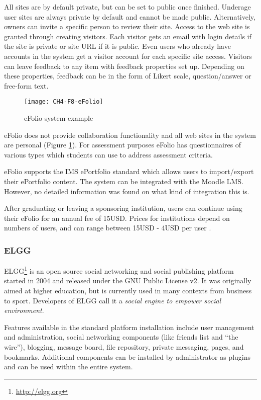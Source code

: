 All sites are by default private, but can be set to public once finished.
Underage user sites are always private by default and cannot be made public.
Alternatively, owners can invite a specific person to review their site. Access
to the web site is granted through creating visitors. Each visitor gets an email
with login details if the site is private or site URL if it is public. Even
users who already have accounts in the system get a visitor account for each
specific site access. Visitors can leave feedback to any item with feedback
properties set up. Depending on these properties, feedback can be in the form of
Likert scale, question/answer or free-form text.

\begin{figure}[htb]
\centering
\setlength\fboxsep{0pt}
\setlength\fboxrule{0.5pt}
\texttt{[image: CH4-F8-eFolio]}
\caption[eFolio system example]{eFolio system example \citep{EFolioMinnesota2011}}
\label{fig:efolio}
\end{figure}

eFolio does not provide collaboration functionality and all web sites in the
system are personal (Figure \ref{fig:efolio}). For assessment purposes eFolio
has questionnaires of various types which students can use to address assessment
criteria.

eFolio supports the IMS ePortfolio standard \citep{AAEEBL2011} which allows
users to import/export their ePortfolio content. The system can be integrated
with the Moodle LMS. However, no detailed information was found on what kind of
integration this is.

After graduating or leaving a sponsoring institution, users can continue
using their eFolio for an annual fee of 15USD. Prices for institutions depend
on numbers of users, and can range between 15USD - 4USD per user
\citep{AAEEBL2011}.

\subsubsection{ELGG}
ELGG\footnote{\url{http://elgg.org}} is an open source social networking and
social publishing platform started in 2004 and released under the GNU Public
License v2. It was originally aimed at higher education, but is currently used
in many contexts from business to sport. Developers of ELGG call it a
\textit{social engine to empower social environment}.

Features available in the standard platform installation include user management
and administration, social networking components (like friends list and ``the
wire''), blogging, message board, file repository, private messaging, pages, and
bookmarks. Additional components can be installed by administrator as plugins
and can be used within the entire system.

